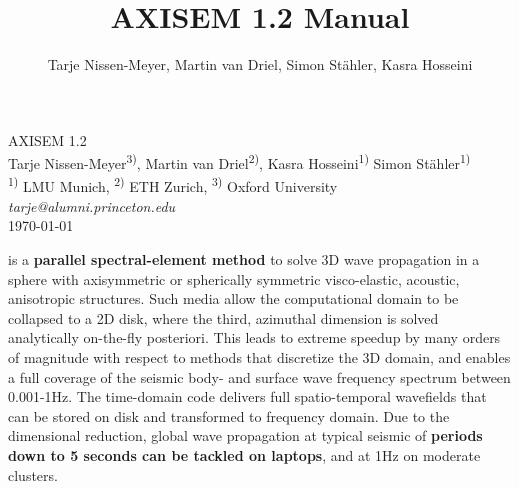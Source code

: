\documentclass[11pt,letter,fleqn,english,notitlepage]{article}
\title{AXISEM 1.2 Manual}
\author{Tarje Nissen-Meyer, Martin van Driel, Simon Stähler, Kasra Hosseini}
\begin{document}
%
\pagestyle{fancy}
\thispagestyle{empty}
%
\begin{center}
{\LARGE {\sc AXISEM 1.2}}
\vspace{1.cm}\\
{\large 
Tarje Nissen-Meyer\textsuperscript{3)},
Martin van Driel\textsuperscript{2)},
Kasra Hosseini\textsuperscript{1)}
Simon St\"{a}hler\textsuperscript{1)}} \\
{\small \textsuperscript{1)} LMU Munich, \textsuperscript{2)} ETH Zurich, 
\textsuperscript{3)} Oxford University \\
\vspace*{0.2cm}
\textit{tarje@alumni.princeton.edu} \hspace*{0.75cm}
\vspace*{0.5cm}\\ 
\today}
\end{center}

\vspace*{1.6cm}
 is a \textbf{parallel spectral-element method} to 
solve 3D wave propagation in a sphere with
axisymmetric or spherically symmetric visco-elastic,
acoustic, anisotropic structures. Such media allow the computational
domain to be collapsed to a 2D disk, where the third, azimuthal
dimension is solved analytically on-the-fly posteriori. This
leads to extreme speedup by many orders of magnitude with respect to methods that discretize the
3D domain, and enables a full coverage of the seismic body- and
surface wave frequency spectrum between 0.001-1Hz. 
The time-domain code delivers full spatio-temporal wavefields that can be stored on
disk and transformed to frequency domain. Due to the dimensional reduction, global 
wave propagation at typical seismic of \textbf{periods down to 5 
seconds can be tackled on laptops}, and at 1Hz on moderate clusters.
\end{document}
